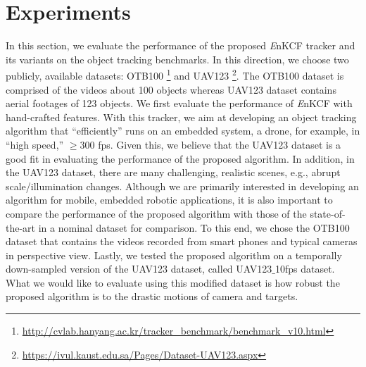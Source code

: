 \documentclass[10pt,twocolumn,letterpaper]{article}
\begin{document}
\section{Experiments} \label{sc:Experiments}
In this section, we evaluate the performance of the proposed {\it E}nKCF
tracker and its variants on the object tracking benchmarks. 
In this direction, we choose two publicly, available datasets:
OTB100 \footnote{\url{http://cvlab.hanyang.ac.kr/tracker_benchmark/benchmark_v10.html}}
and UAV123 \footnote{\url{https://ivul.kaust.edu.sa/Pages/Dataset-UAV123.aspx}}\cite{mueller2016uav123}.
The OTB100 dataset is comprised of the videos about 100 objects
whereas UAV123 dataset contains aerial footages of 123 objects.
We first evaluate the performance of {\it E}nKCF 
with hand-crafted features.  With this tracker, we aim
at developing an object tracking algorithm that ``efficiently'' runs
on an embedded system, a drone, for example, in ``high speed,'' $\ge
300$ fps. Given this, we believe that the UAV123 dataset is a good fit in
evaluating the performance of the proposed algorithm. In addition, in
the UAV123 dataset, there are many challenging, realistic scenes, e.g.,
abrupt scale/illumination changes. Although we are primarily
interested in developing an algorithm for mobile, embedded robotic
applications, it is also important to compare the performance of the
proposed algorithm with those of the state-of-the-art in a nominal
dataset for comparison. To this end, we chose the OTB100 dataset that
contains the videos recorded from smart phones and typical cameras in
perspective view. Lastly, we tested the proposed algorithm on a
temporally down-sampled version of the UAV123 dataset, called
UAV123$\_$10fps dataset. What we would like to evaluate using this
modified dataset is how robust the proposed algorithm is to the
drastic motions of camera and targets.
\end{document}
